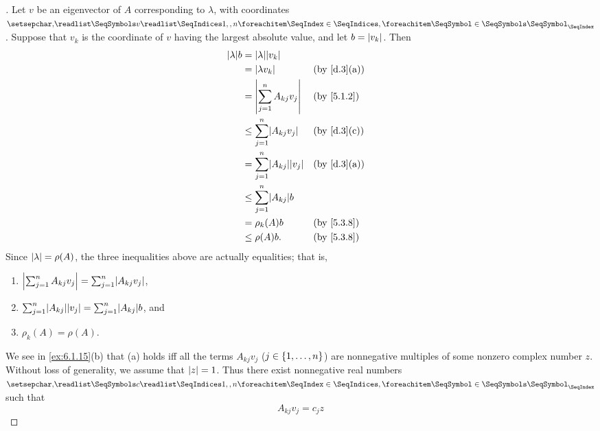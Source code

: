 \begin{proof}[]
  Let \(v\) be an eigenvector of \(A\) corresponding to \(\lambda\), with coordinates \(\seq{v}{1,,n}\).
  Suppose that \(v_k\) is the coordinate of \(v\) having the largest absolute value, and let \(b = \left\lvert v_k\right\rvert\).
  Then
  \begin{align*}
    \abs{\lambda} b & = \abs{\lambda} \abs{v_k}                                               \\
                    & = \abs{\lambda v_k}                      &  & \text{(by \cref{d.3}(a))} \\
                    & = \abs{\sum_{j = 1}^n A_{k j} v_j}       &  & \text{(by \cref{5.1.2})}  \\
                    & \leq \sum_{j = 1}^n \abs{A_{k j} v_j}    &  & \text{(by \cref{d.3}(c))} \\
                    & = \sum_{j = 1}^n \abs{A_{k j}} \abs{v_j} &  & \text{(by \cref{d.3}(a))} \\
                    & \leq \sum_{j = 1}^n \abs{A_{k j}} b                                     \\
                    & = \rho_k(A) b                            &  & \text{(by \cref{5.3.8})}  \\
                    & \leq \rho(A) b.                          &  & \text{(by \cref{5.3.8})}
  \end{align*}
  Since \(\left\lvert\lambda\right\rvert = \rho(A)\), the three inequalities above are actually equalities;
  that is,
  \begin{enumerate}
    \item \(\abs{\sum_{j = 1}^n A_{k j} v_j} = \sum_{j = 1}^n \abs{A_{k j} v_j}\),
    \item \(\sum_{j = 1}^n \abs{A_{k j}} \abs{v_j} = \sum_{j = 1}^n \abs{A_{k j}} b\), and
    \item \(\rho_k(A) = \rho(A)\).
  \end{enumerate}

  We see in \cref{ex:6.1.15}(b) that (a) holds iff all the terms \(A_{k j} v_j\) (\(j \in \left\lbrace1, \dots, n\right\rbrace\)) are nonnegative multiples of some nonzero complex number \(z\).
  Without loss of generality, we assume that \(\left\lvert z\right\rvert = 1\).
  Thus there exist nonnegative real numbers \(\seq{c}{1,,n}\) such that
  \[
    A_{k j} v_j = c_j z
  \]


\end{proof}
